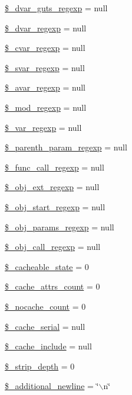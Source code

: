 \begin{DoxyCompactItemize}
\item 
\hyperlink{class_smarty___compiler_a5b7a29ed6bbbdc9bdcaa44f93d22a76d}{\$\-\_\-dvar\-\_\-guts\-\_\-regexp} = null
\item 
\hyperlink{class_smarty___compiler_a5ff515f2b5b83d226cc921c7329d3f5f}{\$\-\_\-dvar\-\_\-regexp} = null
\item 
\hyperlink{class_smarty___compiler_a970ef1136e2d145f672aeedae5e28642}{\$\-\_\-cvar\-\_\-regexp} = null
\item 
\hyperlink{class_smarty___compiler_a292414f7f09bb3ebeac27f334bf284a5}{\$\-\_\-svar\-\_\-regexp} = null
\item 
\hyperlink{class_smarty___compiler_a9ad31b4f1def32f9f0ef821dd61eb189}{\$\-\_\-avar\-\_\-regexp} = null
\item 
\hyperlink{class_smarty___compiler_a0e1eb9b85190cec7f65061062e3158cf}{\$\-\_\-mod\-\_\-regexp} = null
\item 
\hyperlink{class_smarty___compiler_aeed5604b636f16f909069703b776f817}{\$\-\_\-var\-\_\-regexp} = null
\item 
\hyperlink{class_smarty___compiler_a1852ec685e34c7c0151a339508706ade}{\$\-\_\-parenth\-\_\-param\-\_\-regexp} = null
\item 
\hyperlink{class_smarty___compiler_a88351b1d42a225274bf2030747f987a0}{\$\-\_\-func\-\_\-call\-\_\-regexp} = null
\item 
\hyperlink{class_smarty___compiler_a2930f1656f4528a9490a12be7e14ac8d}{\$\-\_\-obj\-\_\-ext\-\_\-regexp} = null
\item 
\hyperlink{class_smarty___compiler_ae747722d6f0e65f4bf8507ef1d0652ef}{\$\-\_\-obj\-\_\-start\-\_\-regexp} = null
\item 
\hyperlink{class_smarty___compiler_af75c377154fc8525710f50c18afd5685}{\$\-\_\-obj\-\_\-params\-\_\-regexp} = null
\item 
\hyperlink{class_smarty___compiler_a05e5d29068b0595c0f11a067f08b2538}{\$\-\_\-obj\-\_\-call\-\_\-regexp} = null
\item 
\hyperlink{class_smarty___compiler_a3047c5783d60e62dba5a8d3e6ff272bf}{\$\-\_\-cacheable\-\_\-state} = 0
\item 
\hyperlink{class_smarty___compiler_a3b268966abebb908a137a87d0e83f4a1}{\$\-\_\-cache\-\_\-attrs\-\_\-count} = 0
\item 
\hyperlink{class_smarty___compiler_a0f09779c61d76f5cffe8bfe5ce4dfd72}{\$\-\_\-nocache\-\_\-count} = 0
\item 
\hyperlink{class_smarty___compiler_af01cffcfcbea585daa04a4c97e85029a}{\$\-\_\-cache\-\_\-serial} = null
\item 
\hyperlink{class_smarty___compiler_a7f51c31864e6e5241313a2102dd32808}{\$\-\_\-cache\-\_\-include} = null
\item 
\hyperlink{class_smarty___compiler_a006aa851ee309c157bd3fb7eccebfcb0}{\$\-\_\-strip\-\_\-depth} = 0
\item 
\hyperlink{class_smarty___compiler_a3e4ba555ca784bb698e8f909289743a5}{\$\-\_\-additional\-\_\-newline} = \char`\"{}$\backslash$n\char`\"{}
\end{DoxyCompactItemize}


